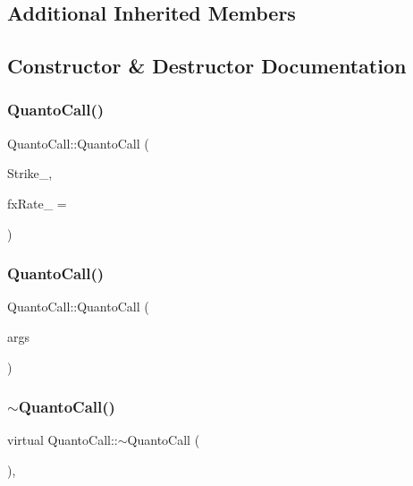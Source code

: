 \subsection*{Additional Inherited Members}


\subsection{Constructor \& Destructor Documentation}
\hypertarget{classQuantoCall_a8e713c9d2e6b9a72d55f524981cfe838}{}\label{classQuantoCall_a8e713c9d2e6b9a72d55f524981cfe838} 
\subsubsection{\texorpdfstring{Quanto\+Call()}{QuantoCall()}\hspace{0.1cm}{\footnotesize\ttfamily [1/2]}}
{\footnotesize\ttfamily Quanto\+Call\+::\+Quanto\+Call (\begin{DoxyParamCaption}\item[{double}]{Strike\+\_\+,  }\item[{double}]{fx\+Rate\+\_\+ = {} }\end{DoxyParamCaption})}

\hypertarget{classQuantoCall_ae1be4dc5d31fedff93f80d9db5819f8a}{}\label{classQuantoCall_ae1be4dc5d31fedff93f80d9db5819f8a} 
\subsubsection{\texorpdfstring{Quanto\+Call()}{QuantoCall()}\hspace{0.1cm}{\footnotesize\ttfamily [2/2]}}
{\footnotesize\ttfamily Quanto\+Call\+::\+Quanto\+Call (\begin{DoxyParamCaption}\item[{const \hyperlink{classMJArray}{M\+J\+Array} \&}]{args }\end{DoxyParamCaption})}

\hypertarget{classQuantoCall_a044fed51d92c3899e6468e3d918f0191}{}\label{classQuantoCall_a044fed51d92c3899e6468e3d918f0191} 
\subsubsection{\texorpdfstring{$\sim$\+Quanto\+Call()}{~QuantoCall()}}
{\footnotesize\ttfamily virtual Quanto\+Call\+::$\sim$\+Quanto\+Call (\begin{DoxyParamCaption}{ }\end{DoxyParamCaption})\hspace{0.3cm}{\ttfamily [inline]}, {\ttfamily [virtual]}}



